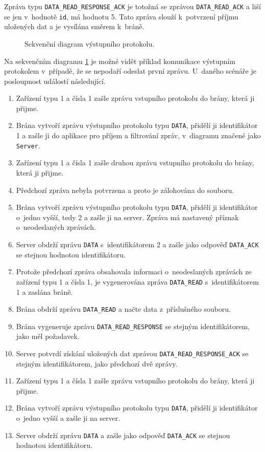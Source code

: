 Zpráva typu \texttt{DATA\_READ\_RESPONSE\_ACK} je totožná se zprávou \texttt{DATA\_READ\_ACK} a liší se jen v~hodnotě \texttt{id}, má hodnotu 5. Tato zpráva slouží k~potvrzení příjmu uložených dat a je vysílána směrem k~bráně.

\begin{figure}[ht]
  \centering
  
  \caption{Sekvenční diagram výstupního protokolu.}
  \label{dia:out_protocol}
\end{figure}

Na sekvenčním diagramu \ref{dia:out_protocol} je možné vidět příklad komunikace výstupním protokolem v~případě, že se nepodaří odeslat první zprávu. U~daného scénáře je posloupnost událostí následující.
\begin{enumerate}
    \item Zařízení typu 1 a čísla 1 zašle zprávu vstupního protokolu do brány, která ji přijme.
    \item Brána vytvoří zprávu výstupního protokolu typu \texttt{DATA}, přidělí ji identifikátor 1 a zašle ji do aplikace pro příjem a filtrování zpráv, v~diagramu značené jako \texttt{Server}.
    \item Zařízení typu 1 a čísla 1 zašle druhou zprávu vstupního protokolu do brány, která ji přijme.
    \item Předchozí zpráva nebyla potvrzena a proto je zálohována do souboru.
    \item Brána vytvoří zprávu výstupního protokolu typu \texttt{DATA}, přidělí ji identifikátor o~jedno vyšší, tedy 2 a zašle ji na server. Zpráva má nastavený příznak o~neodeslaných zprávách.
    \item Server obdrží zprávu \texttt{DATA} s~identifikátorem 2 a zašle jako odpověď \texttt{DATA\_ACK} se stejnou hodnotou identifikátoru.
    \item Protože předchozí zpráva obsahovala informaci o~neodeslaných zprávách ze zařízení typu 1 a čísla 1, je vygenerována zpráva \texttt{DATA\_READ} s~identifikátorem 1 a zaslána bráně.
    \item Brána obdrží zprávu \texttt{DATA\_READ} a načte data z~příslušného souboru.
    \item Brána vygeneruje zprávu \texttt{DATA\_READ\_RESPONSE} se stejným identifikátorem, jako měl požadavek.
    \item Server potvrdí získání uložených dat zprávou \texttt{DATA\_READ\_RESPONSE\_ACK} se stejným identifikátorem, jako předchozí dvě zprávy. 
    \item Zařízení typu 1 a čísla 1 zašle zprávu vstupního protokolu do brány, která ji přijme.
    \item Brána vytvoří zprávu výstupního protokolu typu \texttt{DATA}, přidělí ji identifikátor o~jedno vyšší a zašle ji na server.
    \item  Server obdrží zprávu \texttt{DATA} a zašle jako odpověď \texttt{DATA\_ACK} se stejnou hodnotou identifikátoru.
\end{enumerate}


